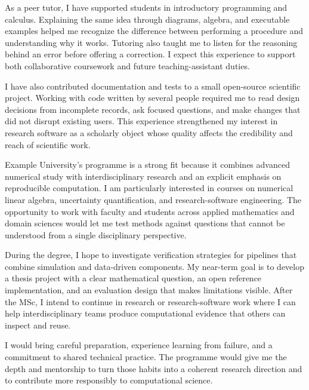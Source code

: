 \documentclass[type=purpose]{careerdossier-statement}
\begin{document}

As a peer tutor, I have supported students in introductory programming and
calculus. Explaining the same idea through diagrams, algebra, and executable
examples helped me recognize the difference between performing a procedure and
understanding why it works. Tutoring also taught me to listen for the reasoning
behind an error before offering a correction. I expect this experience to
support both collaborative coursework and future teaching-assistant duties.

I have also contributed documentation and tests to a small open-source
scientific project. Working with code written by several people required me to
read design decisions from incomplete records, ask focused questions, and make
changes that did not disrupt existing users. This experience strengthened my
interest in research software as a scholarly object whose quality affects the
credibility and reach of scientific work.


Example University's programme is a strong fit because it combines advanced
numerical study with interdisciplinary research and an explicit emphasis on
reproducible computation. I am particularly interested in courses on numerical
linear algebra, uncertainty quantification, and research-software engineering.
The opportunity to work with faculty and students across applied mathematics
and domain sciences would let me test methods against questions that cannot be
understood from a single disciplinary perspective.

During the degree, I hope to investigate verification strategies for pipelines
that combine simulation and data-driven components. My near-term goal is to
develop a thesis project with a clear mathematical question, an open reference
implementation, and an evaluation design that makes limitations visible. After
the MSc, I intend to continue in research or research-software work where I can
help interdisciplinary teams produce computational evidence that others can
inspect and reuse.

I would bring careful preparation, experience learning from failure, and a
commitment to shared technical practice. The programme would give me the depth
and mentorship to turn those habits into a coherent research direction and to
contribute more responsibly to computational science.
\end{document}
